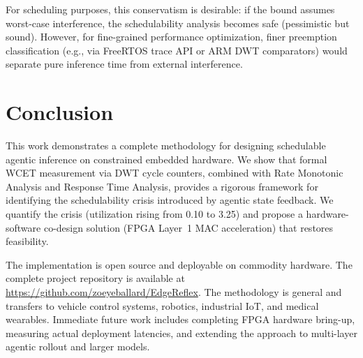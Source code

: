 \documentclass[conference]{IEEEtran}
\begin{document}
For scheduling purposes, this conservatism is desirable: if the bound assumes worst-case interference, the schedulability analysis becomes safe (pessimistic but sound). However, for fine-grained performance optimization, finer preemption classification (e.g., via FreeRTOS trace API or ARM DWT comparators) would separate pure inference time from external interference.

\section{Conclusion}

This work demonstrates a complete methodology for designing schedulable agentic inference on constrained embedded hardware. We show that formal WCET measurement via DWT cycle counters, combined with Rate Monotonic Analysis and Response Time Analysis, provides a rigorous framework for identifying the schedulability crisis introduced by agentic state feedback. We quantify the crisis (utilization rising from 0.10 to 3.25) and propose a hardware-software co-design solution (FPGA Layer~1 MAC acceleration) that restores feasibility.

The implementation is open source and deployable on commodity hardware. The complete project repository is available at \url{https://github.com/zoeyeballard/EdgeReflex}. The methodology is general and transfers to vehicle control systems, robotics, industrial IoT, and medical wearables. Immediate future work includes completing FPGA hardware bring-up, measuring actual deployment latencies, and extending the approach to multi-layer agentic rollout and larger models.



\end{document}
